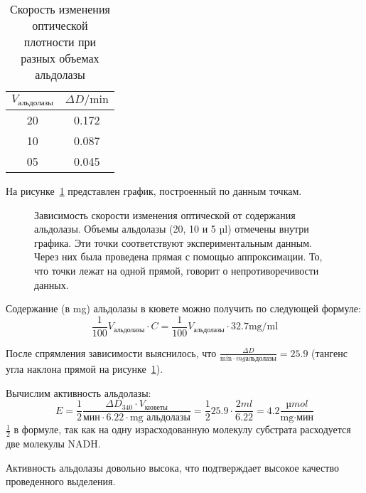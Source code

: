 \begin{table}[htbp]
\caption{Скорость изменения оптической плотности при разных объемах альдолазы}
\begin{tabular}{|c|c|}
\hline
$ V_{\text{альдолазы}} $ & $ \Delta D / \text{min} $ \\
\hline
20 & 0.172 \\
10 & 0.087 \\
05 & 0.045 \\
\hline
\end{tabular}
\label{table-ald-to-delta-d-min}
\end{table}

На рисунке~\ref{act-v-to-delta-d} представлен график,
построенный по данным точкам.

\begin{figure}[htbp]

\caption{Зависимость скорости изменения оптической от содержания альдолазы.
    Объемы альдолазы (20, 10 и 5 µl) отмечены внутри графика.
    Эти точки соответствуют экспериментальным данным.
    Через них была проведена прямая с помощью аппроксимации.
    То, что точки лежат на одной прямой, говорит о непротиворечивости данных.}
\label{act-v-to-delta-d}
\end{figure}

Содержание (в mg) альдолазы в кювете можно получить по следующей формуле:
$$ \frac{1}{100} V_\text{альдолазы} \cdot C =
   \frac{1}{100} V_\text{альдолазы} \cdot 32.7 \text{mg/ml} $$

После спрямления зависимости выяснилось, что
$\frac{\Delta D}{\text{min} \cdot {mg альдолазы}} = 25.9$
(тангенс угла наклона прямой на рисунке~\ref{act-v-to-delta-d}).

Вычислим активность альдолазы:
$$ E = \frac{1}{2} \frac{\Delta D_{340} \cdot V_{кюветы}}{\text{мин} \cdot 6.22 \cdot \text{mg альдолазы}} =
    \frac{1}{2} 25.9 \cdot \frac{2 ml}{6.22} = 4.2 \frac{µmol}{\text{mg} \cdot \text{мин}} $$
$\frac{1}{2}$ в формуле, так как на одну израсходованную молекулу субстрата
расходуется две молекулы NADH.

Активность альдолазы довольно высока, что подтверждает высокое качество
проведенного выделения.

